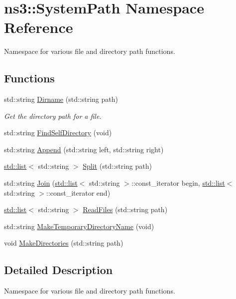 \hypertarget{namespacens3_1_1SystemPath}{}\section{ns3\+:\+:System\+Path Namespace Reference}
\label{namespacens3_1_1SystemPath}


Namespace for various file and directory path functions.  


\subsection*{Functions}
\begin{DoxyCompactItemize}
\item 
std\+::string \hyperlink{group__systempath_ga657599fb7660fc6ebe4b6aaea0021176}{Dirname} (std\+::string path)
\begin{DoxyCompactList}\small\item\em Get the directory path for a file. \end{DoxyCompactList}\item 
std\+::string \hyperlink{group__systempath_gad52e6f153465b40487da3a2a9ee5f5d6}{Find\+Self\+Directory} (void)
\item 
std\+::string \hyperlink{group__systempath_gaaa5a530cee42c8eda7e4f4523ef7e1cd}{Append} (std\+::string left, std\+::string right)
\item 
\hyperlink{openflow-interface_8h_afd9bcfa176617760671b67580f536fa7}{std\+::list}$<$ std\+::string $>$ \hyperlink{group__systempath_ga523072e05da63b63113d1bea840edf1a}{Split} (std\+::string path)
\item 
std\+::string \hyperlink{group__systempath_gab3212957e6b4f873ece3c6b8ed746d72}{Join} (\hyperlink{openflow-interface_8h_afd9bcfa176617760671b67580f536fa7}{std\+::list}$<$ std\+::string $>$\+::const\+\_\+iterator begin, \hyperlink{openflow-interface_8h_afd9bcfa176617760671b67580f536fa7}{std\+::list}$<$ std\+::string $>$\+::const\+\_\+iterator end)
\item 
\hyperlink{openflow-interface_8h_afd9bcfa176617760671b67580f536fa7}{std\+::list}$<$ std\+::string $>$ \hyperlink{group__systempath_ga152a348bccf02d8373607b0239587b87}{Read\+Files} (std\+::string path)
\item 
std\+::string \hyperlink{group__systempath_ga271d7de64c9f6454db57fe21bc51c5d0}{Make\+Temporary\+Directory\+Name} (void)
\item 
void \hyperlink{group__systempath_ga9529f7530ba5d513c8811acc15743d24}{Make\+Directories} (std\+::string path)
\end{DoxyCompactItemize}


\subsection{Detailed Description}
Namespace for various file and directory path functions. 